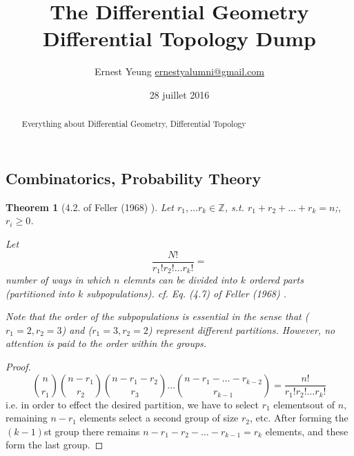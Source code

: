 \documentclass[10pt]{amsart}
\title{The Differential Geometry Differential Topology Dump}
\author{Ernest Yeung \href{mailto:ernestyalumni@gmail.com}{ernestyalumni@gmail.com}}
\date{28 juillet 2016}
\newtheorem{theorem}{Theorem}
\begin{document}

\maketitle



\begin{multicols*}{2}

  
\setcounter{tocdepth}{1}
\tableofcontents



\begin{abstract}
Everything about Differential Geometry, Differential Topology

\end{abstract}

\part{Combinatorics, Probability Theory}

\begin{theorem}[4.2. of Feller (1968)  \cite{Fell1968}]
	Let $r_1,\dots r_k \in \mathbb{Z}$, s.t. $r_1 + r_2 + \dots + r_k = n$;, $r_i \geq 0$.  

Let 
\begin{equation}
\frac{ N! }{r_1! r_2! \dots r_k!} = 
\end{equation}
number of ways in which $n$ elemnts can be divided into $k$ ordered parts (partitioned into $k$ subpopulations).  cf. Eq. (4.7) of Feller (1968)  \cite{Fell1968}.  

Note that the order of the subpopulations is essential in the sense that ($r_1 = 2,r_2 =3$) and ($r_1=3,r_2=2$) represent different partitions.  However, no attention is paid to the order within the groups.  

\end{theorem}
\begin{proof}
\begin{equation}
\binom{n}{r_1} \binom{n-r_1}{r_2} \binom{n-r_1-r_2}{r_3} \dots \binom{n-r_1-\dots - r_{k-2} }{ r_{k-1} } = \frac{n!}{ r_1! r_2! \dots r_k! }
\end{equation}
i.e. in order to effect the desired partition, we have to select $r_1$ elementsout of $n$, remaining $n-r_1$ elements select a second group of size $r_2$, etc.  After forming the $(k-1)$st group there remains $n-r_1 -r_2 - \dots - r_{k-1} = r_k$ elements, and these form the last group.  
\end{proof}


\end{multicols*}
\end{document}
